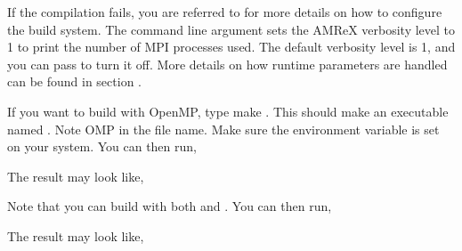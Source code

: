 \documentclass[letterpaper,10pt,english]{sphinxmanual}
\begin{document}
\sphinxAtStartPar
If the compilation fails, you are referred to {\hyperref[\detokenize{BuildingAMReX_Chapter:chap-buildingamrex}]{}} for
more details on how to configure the build system.  The  command line
argument  sets the AMReX verbosity level
to 1 to print the number of MPI processes used.  The default verbosity
level is 1, and you can pass  to turn it off.
More details on how runtime parameters are handled can be found in
section {\hyperref[\detokenize{Basics:sec-basics-parmparse}]{}}.

\sphinxAtStartPar
If you want to build with OpenMP, type make .  This should make
an executable named . Note OMP in the file name.
Make sure the  environment variable is set on your system.
You can then run,

\begin{sphinxVerbatim}[commandchars=\\\{\}]
\end{sphinxVerbatim}

\sphinxAtStartPar
The result may look like,

\begin{sphinxVerbatim}[commandchars=\\\{\}]
\end{sphinxVerbatim}

\sphinxAtStartPar
Note that you can build with both  and .  You
can then run,

\begin{sphinxVerbatim}[commandchars=\\\{\}]
\end{sphinxVerbatim}

\sphinxAtStartPar
The result may look like,
\end{document}
